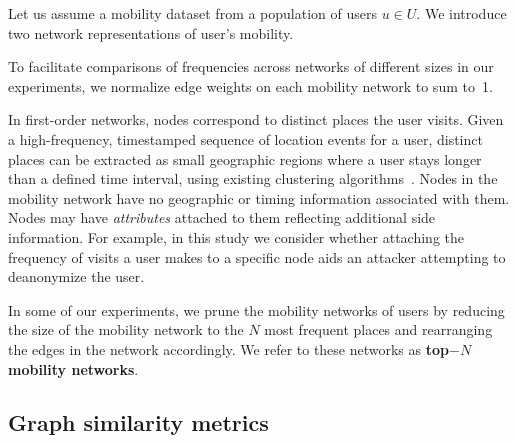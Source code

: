 Let us assume a mobility dataset from a population of users $ u \in U$.
We introduce two network representations of user's mobility.



\vspace{.4cm}
To facilitate comparisons of frequencies across networks of different sizes in our experiments, we normalize edge weights on each mobility network to sum \mbox{to 1}.

In first-order networks, nodes correspond to distinct places the user visits.
Given a high-frequency, timestamped sequence of location events for a user, distinct places can be extracted as small geographic regions where a user stays longer than a defined time interval, using existing clustering algorithms~\citep{kang2005extracting}.
Nodes in the mobility network have no geographic or timing information associated with them.
Nodes may have \emph{attributes} attached to them reflecting additional side information.
For example, in this study we consider whether attaching the frequency of visits a user makes to a specific node aids an attacker attempting to deanonymize the user.

In some of our experiments, we prune the mobility networks of users by reducing the size of the mobility network to the $ N $ most frequent places and rearranging the edges in the network accordingly.
We refer to these networks as \textbf{top$-N $ mobility networks}.

\subsection{Graph similarity metrics\label{sec:graph-kernels}}


